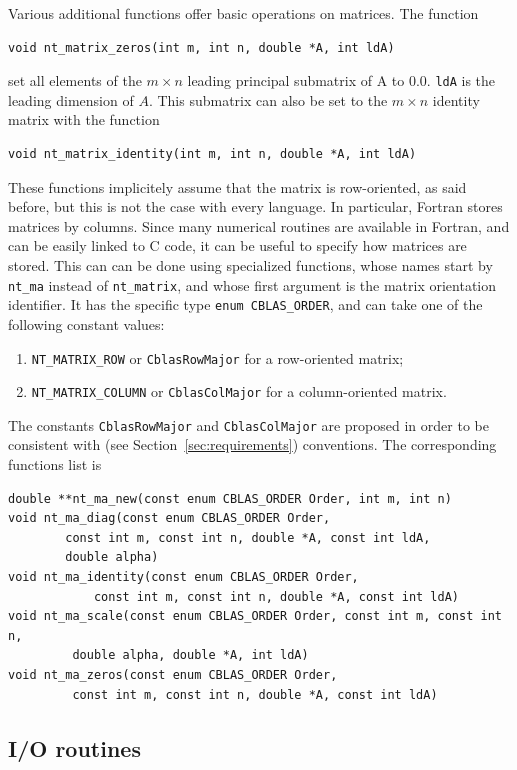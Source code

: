 Various additional functions offer basic operations on matrices.
The function
\begin{verbatim}
void nt_matrix_zeros(int m, int n, double *A, int ldA)
\end{verbatim}
set all elements of the $m \times n$ leading principal submatrix of A to 0.0.
\verb|ldA| is the leading dimension of $A$.
This submatrix can also be set to the $m \times n$ identity matrix
 with the function
\begin{verbatim}
void nt_matrix_identity(int m, int n, double *A, int ldA)
\end{verbatim}
These functions implicitely assume that the matrix is row-oriented, as
said before, but this is not the case with every
language. In particular, Fortran stores matrices by columns.
Since many numerical routines are available in Fortran, and can be
easily linked to C code, it can be useful to specify how matrices are
stored.
This can can be done using specialized functions, whose names start by
\verb|nt_ma| instead of \verb|nt_matrix|, and whose first argument is
the matrix orientation identifier.
It has the specific type \verb|enum CBLAS_ORDER|, and can take one of
the following constant values:
\begin{enumerate}
\item
\verb|NT_MATRIX_ROW| or \verb|CblasRowMajor| for a row-oriented matrix;
\item
\verb|NT_MATRIX_COLUMN| or \verb|CblasColMajor| for a column-oriented matrix.
\end{enumerate}
The constants
\verb|CblasRowMajor| and
\verb|CblasColMajor| are
proposed in order to be consistent with \blas{} (see
Section~\ref{sec:requirements}) conventions.
The corresponding functions list is
\begin{verbatim}
double **nt_ma_new(const enum CBLAS_ORDER Order, int m, int n)
void nt_ma_diag(const enum CBLAS_ORDER Order,
		const int m, const int n, double *A, const int ldA,
		double alpha)
void nt_ma_identity(const enum CBLAS_ORDER Order,
		    const int m, const int n, double *A, const int ldA)
void nt_ma_scale(const enum CBLAS_ORDER Order, const int m, const int n,
		 double alpha, double *A, int ldA)
void nt_ma_zeros(const enum CBLAS_ORDER Order,
		 const int m, const int n, double *A, const int ldA)
\end{verbatim}

\subsection{I/O routines}

